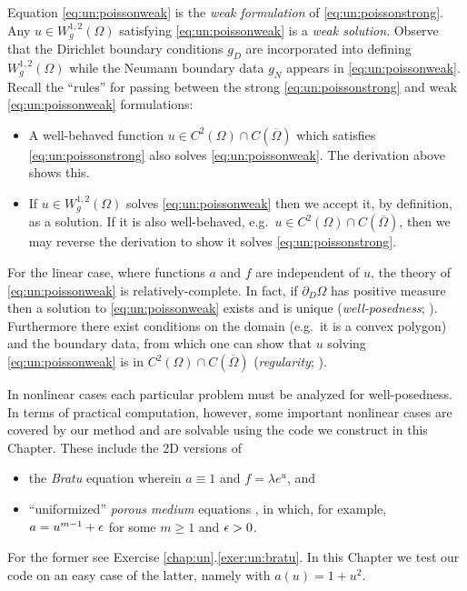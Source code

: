 Equation \eqref{eq:un:poissonweak} is the \emph{weak formulation} of \eqref{eq:un:poissonstrong}.  Any $u \in W^{1,2}_g(\Omega)$ satisfying \eqref{eq:un:poissonweak} is a \emph{weak solution}.  Observe that the Dirichlet boundary conditions $g_D$ are incorporated into defining $W^{1,2}_g(\Omega)$ while the Neumann boundary data $g_N$ appears in \eqref{eq:un:poissonweak}.  Recall the ``rules'' for passing between the strong \eqref{eq:un:poissonstrong} and weak \eqref{eq:un:poissonweak} formulations:\begin{itemize}
\item A well-behaved function $u \in C^2(\Omega) \cap C(\overline \Omega)$ which satisfies \eqref{eq:un:poissonstrong} also solves \eqref{eq:un:poissonweak}.  The derivation above shows this.
\item If $u \in W^{1,2}_g(\Omega)$ solves \eqref{eq:un:poissonweak} then we accept it, by definition, as a solution.   If it is also well-behaved, e.g.~$u \in C^2(\Omega) \cap C(\overline \Omega)$, then we may reverse the derivation to show it solves \eqref{eq:un:poissonstrong}.
\end{itemize}

For the linear case, where functions $a$ and $f$ are independent of $u$, the theory of \eqref{eq:un:poissonweak} is relatively-complete.  In fact, if $\partial_D \Omega$ has positive measure then a solution to \eqref{eq:un:poissonweak} exists and is unique (\emph{well-posedness}; \citep{Ciarlet2002,Evans2010}).  Furthermore there exist conditions on the domain (e.g.~it is a convex polygon) and the boundary data, from which one can show that $u$ solving \eqref{eq:un:poissonweak} is in $C^2(\Omega) \cap C(\overline \Omega)$ (\emph{regularity}; \citep{Evans2010}).

In nonlinear cases each particular problem must be analyzed for well-posedness.  In terms of practical computation, however, some important nonlinear cases are covered by our method and are solvable using the code we construct in this Chapter.  These include the 2D versions of
\begin{itemize}
\item the \emph{Bratu} equation wherein $a\equiv 1$ and $f=\lambda e^u$, and
\item ``uniformized'' \emph{porous medium} equations \citep{Ockendonetal2003}, in which, for example, $a=u^{m-1}+\epsilon$ for some $m\ge 1$ and $\epsilon>0$.
\end{itemize}
For the former see Exercise \ref{chap:un}.\ref{exer:un:bratu}.  In this Chapter we test our code on an easy case of the latter, namely with $a(u)=1+u^2$.


